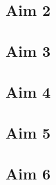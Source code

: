 \lipsum*[4-5]


\subsection{Aim 2}\label{sec:aim2}

\lipsum*[5-6]

\subsection{Aim 3}\label{sec:aim3}

\lipsum*[6-7]

\subsection{Aim 4}\label{sec:aim4}

\lipsum*[7-8]

\subsection{Aim 5}\label{sec:aim5}

\lipsum*[8-9]

\subsection{Aim 6}\label{sec:aim6}

\lipsum*[9-10]